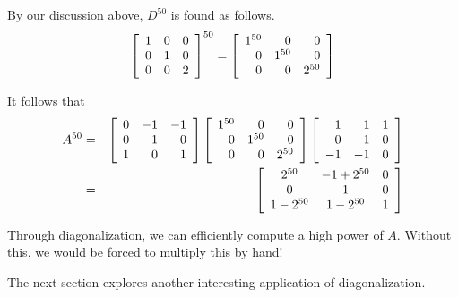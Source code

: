 \begin{solution}
By our discussion above, $D^{50}$ is found as follows.
\begin{equation*}
\left[
\begin{array}{rrr}
1 & 0 & 0 \\
0 & 1 & 0 \\
0 & 0 & 2
\end{array}
\right] ^{50}=\left[
\begin{array}{rrr}
1^{50} & 0      & 0 \\
0      & 1^{50} & 0 \\
0      & 0      & 2^{50}
\end{array}
\right] 
\end{equation*}

It follows that
\begin{eqnarray*}
A^{50} &=&\left[
\begin{array}{rrr}
0 & -1 & -1 \\
0 & 1 & 0 \\
1 & 0 & 1
\end{array}
\right] \left[
\begin{array}{rrr}
1^{50} & 0      & 0 \\
0      & 1^{50} & 0 \\
0      & 0      & 2^{50}
\end{array}
\right] \left[
\begin{array}{rrr}
1 & 1 & 1 \\
0 & 1 & 0 \\
-1 & -1 & 0
\end{array}
\right] \\
&=&\left[
\begin{array}{ccc}
2^{50} & -1+2^{50} & 0 \\
0 & 1 & 0 \\
1-2^{50} & 1-2^{50} & 1
\end{array}
\right] 
\end{eqnarray*}

\end{solution}

Through diagonalization, we can efficiently compute a high power of $A$. Without this, we would be forced to multiply this by hand! 

The next section explores another interesting application of diagonalization. 